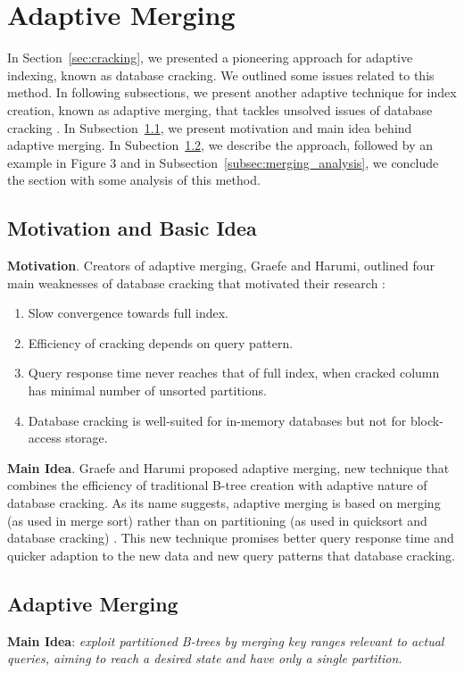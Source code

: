\documentclass[10pt, conference, compsocconf]{IEEEtran}
\begin{document}
\section{Adaptive Merging}
\label{sec:merging}
In Section~\ref{sec:cracking}, we presented a pioneering approach for adaptive indexing, known as database cracking. We outlined some issues related to this method. In following subsections, we present another adaptive technique for index creation, known as adaptive merging, that tackles unsolved issues of database cracking \cite{merging}. In Subsection~\ref{subsec:merging_idea}, we present motivation and main idea behind adaptive merging. In Subection~\ref{subsec:st_merging}, we describe the approach, followed by an example in Figure 3 and in Subsection~\ref{subsec:merging_analysis}, we conclude the section with some analysis of this method.

\subsection{Motivation and Basic Idea}
\label{subsec:merging_idea}
\textbf{Motivation}. Creators of adaptive merging, Graefe and Harumi, outlined four main weaknesses of database cracking that motivated their research \cite{merging}:
\begin{enumerate}
\item{Slow convergence towards full index.}
\item{Efficiency of cracking depends on query pattern.}
\item{Query response time never reaches that of full index, when cracked column has minimal number of unsorted partitions.}
\item{Database cracking is well-suited for in-memory databases but not for block-access storage.}
\end{enumerate}

\textbf{Main Idea}. Graefe and Harumi proposed adaptive merging, new technique that combines the efficiency of traditional B-tree creation with adaptive nature of database cracking. As its name suggests, adaptive merging is based on merging (as used in merge sort) rather than on partitioning (as used in quicksort and database cracking) \cite{merging}. This new technique promises better query response time and quicker adaption to the new data and new query patterns that database cracking.

\subsection{Adaptive Merging}
\label{subsec:st_merging}
\textbf{Main Idea}: \textit{exploit partitioned B-trees \cite{partitionedtrees} by merging key ranges relevant to actual queries, aiming to reach a desired state and have only a single partition.}\\
\end{document}
